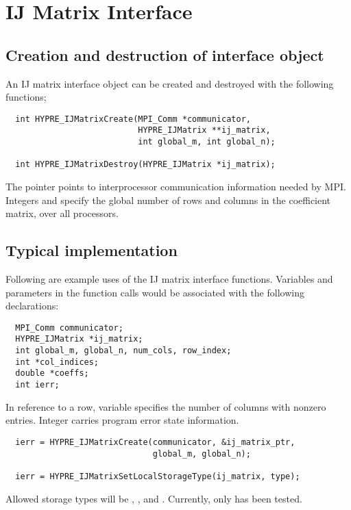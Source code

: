\section{IJ Matrix Interface}

\subsection{Creation and destruction of interface object}

An IJ matrix interface object can be created and destroyed with
the following functions;
\begin{verbatim}
  int HYPRE_IJMatrixCreate(MPI_Comm *communicator,
                           HYPRE_IJMatrix **ij_matrix,
                           int global_m, int global_n);

  int HYPRE_IJMatrixDestroy(HYPRE_IJMatrix *ij_matrix);
\end{verbatim}
\noindent The  pointer 
points to interprocessor communication information needed by MPI.
Integers  and  specify the global
number of rows and columns in the coefficient matrix, over all processors.

\subsection{Typical implementation}

Following are example uses of the IJ matrix interface functions.
Variables and parameters in the
function calls would be associated with the following declarations:

\begin{verbatim}
  MPI_Comm communicator;
  HYPRE_IJMatrix *ij_matrix;
  int global_m, global_n, num_cols, row_index;
  int *col_indices;
  double *coeffs;
  int ierr;
\end{verbatim}

\noindent In reference to a row, variable  specifies
the number of columns with nonzero entries.
Integer  carries program error state information. 

\begin{verbatim}
  ierr = HYPRE_IJMatrixCreate(communicator, &ij_matrix_ptr,
                              global_m, global_n);

  ierr = HYPRE_IJMatrixSetLocalStorageType(ij_matrix, type);
\end{verbatim}

\noindent Allowed storage types will be ,
, and .  Currently, only
 has been tested. 

